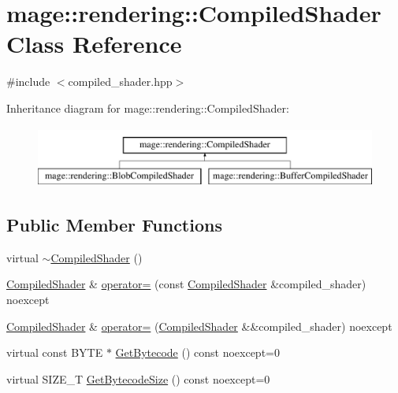 \hypertarget{classmage_1_1rendering_1_1_compiled_shader}{}\section{mage\+:\+:rendering\+:\+:Compiled\+Shader Class Reference}
\label{classmage_1_1rendering_1_1_compiled_shader}


{\ttfamily \#include $<$compiled\+\_\+shader.\+hpp$>$}

Inheritance diagram for mage\+:\+:rendering\+:\+:Compiled\+Shader\+:\begin{figure}[H]
\begin{center}
\leavevmode
\includegraphics[height=2.000000cm]{classmage_1_1rendering_1_1_compiled_shader}
\end{center}
\end{figure}
\subsection*{Public Member Functions}
\begin{DoxyCompactItemize}
\item 
virtual \hyperlink{classmage_1_1rendering_1_1_compiled_shader_abb17672237a99552beef603cd1d4f680}{$\sim$\+Compiled\+Shader} ()
\item 
\hyperlink{classmage_1_1rendering_1_1_compiled_shader}{Compiled\+Shader} \& \hyperlink{classmage_1_1rendering_1_1_compiled_shader_a1981d885693b7849078f509f15b81071}{operator=} (const \hyperlink{classmage_1_1rendering_1_1_compiled_shader}{Compiled\+Shader} \&compiled\+\_\+shader) noexcept
\item 
\hyperlink{classmage_1_1rendering_1_1_compiled_shader}{Compiled\+Shader} \& \hyperlink{classmage_1_1rendering_1_1_compiled_shader_ab4217b5b68c5cc33b6736a844ddfe699}{operator=} (\hyperlink{classmage_1_1rendering_1_1_compiled_shader}{Compiled\+Shader} \&\&compiled\+\_\+shader) noexcept
\item 
virtual const B\+Y\+TE $\ast$ \hyperlink{classmage_1_1rendering_1_1_compiled_shader_a6067250341f428be19ed2aa9955a10b6}{Get\+Bytecode} () const noexcept=0
\item 
virtual S\+I\+Z\+E\+\_\+T \hyperlink{classmage_1_1rendering_1_1_compiled_shader_a92c17b46242bf884c3d0d673e88a292d}{Get\+Bytecode\+Size} () const noexcept=0
\end{DoxyCompactItemize}
